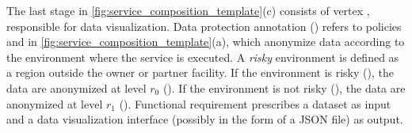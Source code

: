 \begin{example}[\bf \pipelineTemplate]
  The last stage in \cref{fig:service_composition_template}(c) consists of vertex , responsible for data visualization.
  Data protection annotation \myLambda() refers to policies  and  in \cref{fig:service_composition_template}(a), which anonymize data according to the environment where the service is executed.
  A \emph{risky} environment is defined as a region outside the owner or partner facility.
  If the environment is risky (), the data are anonymized at level $r_0$ ().
  If the environment is not risky (), the data are anonymized at level $r_1$ ().
  Functional requirement  prescribes a dataset as input and a data visualization interface (possibly in the form of a JSON file) as output.
\end{example}
